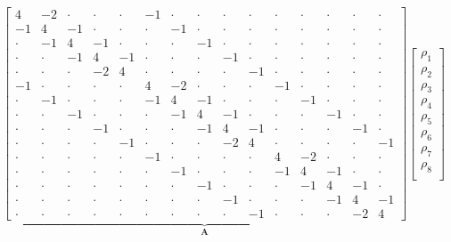 \documentclass[11pt,a4paper]{article}
\numberwithin{equation}{section}
\theoremstyle{definition}
\theoremstyle{remark}
\newcommand{\bA}{\mathbf{A}}
\begin{document}
\begin{equation}\label{eq:system-explicit}
  \underbrace{\begin{bmatrix}
     4 & -2 & \cdot & \cdot & \cdot & -1 & \cdot & \cdot & \cdot & \cdot & \cdot & \cdot & \cdot & \cdot & \cdot \\
    -1 &  4 & -1 & \cdot & \cdot & \cdot & -1 & \cdot & \cdot & \cdot & \cdot & \cdot & \cdot & \cdot & \cdot \\
    \cdot & -1 &  4 & -1 & \cdot & \cdot & \cdot & -1 & \cdot & \cdot & \cdot & \cdot & \cdot & \cdot & \cdot \\
    \cdot & \cdot & -1 &  4 & -1 & \cdot & \cdot & \cdot & -1 & \cdot & \cdot & \cdot & \cdot & \cdot & \cdot \\
    \cdot & \cdot & \cdot & -2 &  4 & \cdot & \cdot & \cdot & \cdot & -1 & \cdot & \cdot & \cdot & \cdot & \cdot \\
    -1 & \cdot & \cdot & \cdot & \cdot &  4 & -2 & \cdot & \cdot & \cdot & -1 & \cdot & \cdot & \cdot & \cdot \\
    \cdot & -1 & \cdot & \cdot & \cdot & -1 &  4 & -1 & \cdot & \cdot & \cdot & -1 & \cdot & \cdot & \cdot \\
    \cdot & \cdot & -1 & \cdot & \cdot & \cdot & -1 &  4 & -1 & \cdot & \cdot & \cdot & -1 & \cdot & \cdot \\
    \cdot & \cdot & \cdot & -1 & \cdot & \cdot & \cdot & -1 &  4 & -1 & \cdot & \cdot & \cdot & -1 & \cdot \\
    \cdot & \cdot & \cdot & \cdot & -1 & \cdot & \cdot & \cdot & -2 &  4 & \cdot & \cdot & \cdot & \cdot & -1 \\
    \cdot & \cdot & \cdot & \cdot & \cdot & -1 & \cdot & \cdot & \cdot & \cdot &  4 & -2 & \cdot & \cdot & \cdot \\
    \cdot & \cdot & \cdot & \cdot & \cdot & \cdot & -1 & \cdot & \cdot & \cdot & -1 &  4 & -1 & \cdot & \cdot \\
    \cdot & \cdot & \cdot & \cdot & \cdot & \cdot & \cdot & -1 & \cdot & \cdot & \cdot & -1 &  4 & -1 & \cdot \\
    \cdot & \cdot & \cdot & \cdot & \cdot & \cdot & \cdot & \cdot & -1 & \cdot & \cdot & \cdot & -1 &  4 & -1 \\
    \cdot & \cdot & \cdot & \cdot & \cdot & \cdot & \cdot & \cdot & \cdot & -1 & \cdot & \cdot & \cdot & -2 &  4
  \end{bmatrix}}_{\bA}
  \begin{bmatrix}
    \rho_1 \\ \rho_2 \\ \rho_3 \\ \rho_4 \\ \rho_5 \\ \rho_6 \\ \rho_7 \\ \rho_8 \\

\end{bmatrix}
\end{equation}
\end{document}
